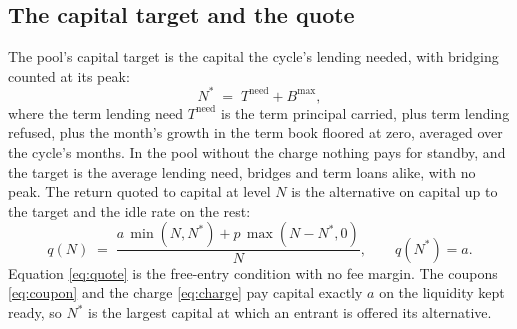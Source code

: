 \documentclass[10pt,a4paper]{article}
\theoremstyle{remark}
\begin{document}
\subsection{The capital target and the quote}
The pool's capital target is the capital the cycle's lending needed, with
bridging counted at its peak:
\begin{equation}
N^{*} \;=\; T^{\mathrm{need}}+B^{\max},
\label{eq:target}
\end{equation}
where the term lending need \(T^{\mathrm{need}}\) is the term principal
carried, plus term lending refused, plus the month's growth in the term book
floored at zero, averaged over the cycle's months. In the pool without the
charge nothing pays for standby, and the target is the average lending need,
bridges and term loans alike, with no peak. The return quoted to
capital at level \(N\) is the alternative on capital up to the target and the
idle rate on the rest:
\begin{equation}
q(N) \;=\; \frac{a\,\min(N,N^{*})+p\,\max(N-N^{*},0)}{N},
\qquad q(N^{*})=a .
\label{eq:quote}
\end{equation}
Equation \eqref{eq:quote} is the free-entry condition with no fee margin. The
coupons \eqref{eq:coupon} and the charge \eqref{eq:charge} pay capital exactly
\(a\) on the liquidity kept ready, so \(N^{*}\) is the largest capital at
which an entrant is offered its alternative.
\end{document}
